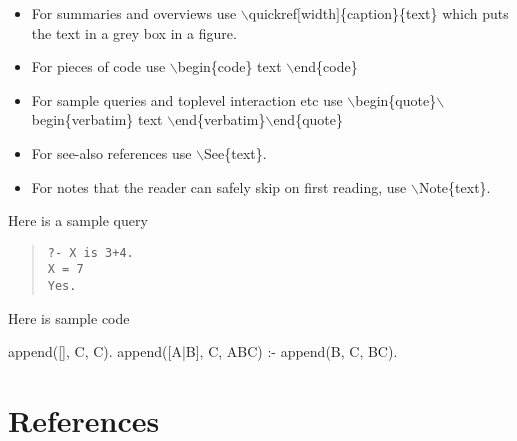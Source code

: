 \begin{itemize}
\item
	For summaries and overviews use
	$\backslash$quickref$[$width$]$\{caption\}\{text\}
	which puts the text in a grey box in a figure.
\item For pieces of code use
$\backslash$begin\{code\}
text
$\backslash$end\{code\}
\item For sample queries and toplevel interaction etc use
$\backslash$begin\{quote\}$\backslash$begin\{verbatim\} text
$\backslash$end\{verbatim\}$\backslash$end\{quote\}
\item For see-also references use $\backslash$See\{text\}.
\item For notes that the reader can safely skip on first reading,
use $\backslash$Note\{text\}.
\end{itemize}

Here is a sample query
\begin{quote}\begin{verbatim}
?- X is 3+4.
X = 7
Yes.
\end{verbatim}\end{quote}

Here is sample code
\begin{code}
append([], C, C).
append([A|B], C, ABC) :- append(B, C, BC).
\end{code}

\section{References}

